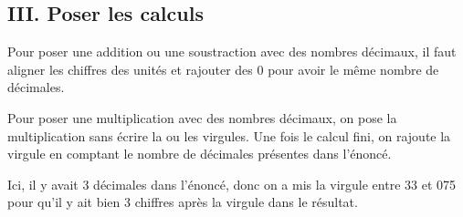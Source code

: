 \subsection*{III. Poser les calculs}

\begin{Méthode}[c] 
Pour poser une addition ou une soustraction avec des nombres décimaux, il faut aligner les chiffres des unités et rajouter des 0 pour avoir le même nombre de décimales. \\
\begin{center}
\hspace{2cm}
\end{center}

\end{Méthode}

\begin{Exemples}
\begin{center}
\hspace{2cm}
\end{center}
\end{Exemples}

\newpage

\begin{Méthode}[c] 
Pour poser une multiplication avec des nombres décimaux, on pose la multiplication sans écrire la ou les virgules. Une fois le calcul fini, on rajoute la virgule en comptant le nombre de décimales présentes dans l'énoncé. \\
\begin{center}
\end{center}
Ici, il  y avait 3 décimales dans l'énoncé, donc on a mis la virgule entre 33 et 075 pour qu'il  y ait bien 3 chiffres après la virgule dans le résultat.
\end{Méthode}

\begin{Exemple}
\begin{center}
\end{center}
\end{Exemple}


\newpage